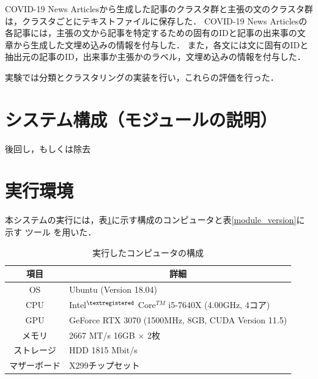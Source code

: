 \documentclass[12pt,a4j]{jreport}
\begin{document}
COVID-19 News Articlesから生成した記事のクラスタ群と主張の文のクラスタ群は，クラスタごとにテキストファイルに保存した．
COVID-19 News Articlesの各記事には，主張の文から記事を特定するための固有のIDと記事の出来事の文章から生成した文埋め込みの情報を付与した．
また，各文には文に固有のIDと抽出元の記事のID，出来事か主張かのラベル，文埋め込みの情報を付与した．

実験では分類とクラスタリングの実装を行い，これらの評価を行った．


\section{システム構成（モジュールの説明）}
後回し，もしくは除去

\section{実行環境}
本システムの実行には，表\ref{pc_spec}に示す構成のコンピュータと表\ref{module_version}に示す
ツール
を用いた．

\begin{table}[H]
  \caption{実行したコンピュータの構成}
  \centering
  \vspace{4mm}
  \begin{tabular}{cl}
    \hline
    項目 & \multicolumn{1}{c}{詳細} \\
    \hline
    OS & Ubuntu (Version 18.04) \\
    CPU & Intel$^{\textregistered}$ Core$^{TM}$ i5-7640X (4.00GHz, 4コア) \\
    GPU & GeForce RTX 3070 (1500MHz, 8GB,
    CUDA Version 11.5) \\
    メモリ & 2667 MT/s 16GB $\times$ 2枚 \\
    ストレージ & HDD 1815 Mbit/s \\
    マザーボード & X299チップセット \\
    \hline
    \end{tabular}
  \label{pc_spec}
\end{table}
\end{document}
